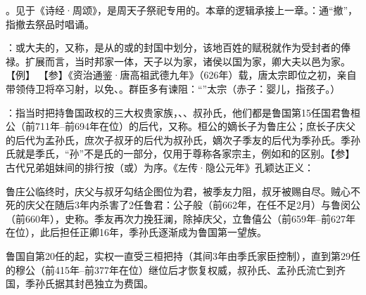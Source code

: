 {
\item {}。见于《诗经·周颂》，是周天子祭祀专用的。本章的逻辑承接上一章。：通“撤”，指撤去祭品时唱诵。

：或大夫的，又称，是从的或的封国中划分，该地百姓的赋税就作为受封者的俸禄。扩展而言，当时邦家一体，天子以为家，诸侯以国为家，卿大夫以邑为家。【例】 【参】《资治通鉴·唐高祖武德九年》（626年）载，唐太宗即位之初，亲自带领侍卫将卒习射，以免、。群臣多有谏阻：“”太宗（赤子：婴儿，指孩子。）

：指当时把持鲁国政权的三大权贵家族，、、叔孙氏，他们都是鲁国第15任国君鲁桓公（前711年--前694年在位）的后代，又称。桓公的嫡长子为鲁庄公；庶长子庆父的后代为孟孙氏，庶次子叔牙的后代为叔孙氏，嫡次子季友的后代为季孙氏。季孙氏就是季氏，“孙”不是氏的一部分，仅用于尊称各家宗主，例如和的区别。【参】古代兄弟姐妹间的排行按（或）为序。《左传·隐公元年》孔颖达正义：

鲁庄公临终时，庆父与叔牙勾结企图位为君，被季友力阻，叔牙被赐自尽。贼心不死的庆父在随后3年内杀害了2任鲁君：公子般（前662年，在任不足2月）与鲁闵公（前660年），史称。季友再次力挽狂澜，除掉庆父，立鲁僖公（前659年--前627年在位），此后担任正卿16年，季孙氏逐渐成为鲁国第一望族。

鲁国自第20任的起，实权一直受三桓把持（其间3年由季氏家臣控制），直到第29任的穆公（前415年--前377年在位）继位后才恢复权威，叔孙氏、孟孙氏流亡到齐国，季孙氏据其封邑独立为费国。%

}
